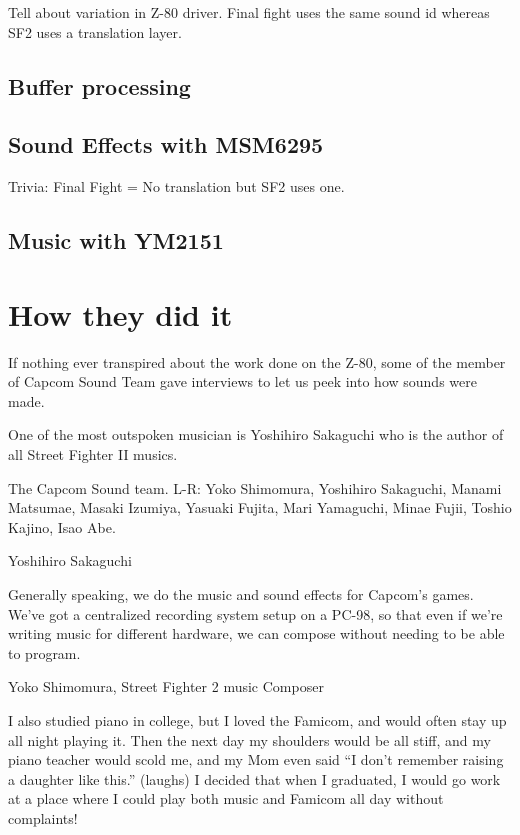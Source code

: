 Tell about variation in Z-80 driver. Final fight uses the same sound id whereas SF2 uses a translation layer.

\subsection{Buffer processing}

\subsection{Sound Effects with MSM6295}
Trivia: Final Fight = No translation but SF2 uses one.

\subsection{Music with YM2151}

\section{How they did it}
If nothing ever transpired about the work done on the Z-80, some of the member of Capcom Sound Team gave interviews to let us peek into how sounds were made.

One of the most outspoken musician is Yoshihiro Sakaguchi who is the author of all Street Fighter II musics.


The Capcom Sound team. L-R: Yoko Shimomura, Yoshihiro Sakaguchi, Manami Matsumae, Masaki Izumiya, Yasuaki Fujita, Mari Yamaguchi, Minae Fujii, Toshio Kajino, Isao Abe.

\begin{q}{Yoshihiro Sakaguchi\cite{yoko_shimomura_interview}  }

Generally speaking, we do the music and sound effects for Capcom’s games. We’ve got a centralized recording system setup on a PC-98, so that even if we’re writing music for different hardware, we can compose without needing to be able to program.
\end{q}

\begin{q}{Yoko Shimomura, Street Fighter 2 music Composer\cite{beep199010}}

I also studied piano in college, but I loved the Famicom, and would often stay up all night playing it. Then the next day my shoulders would be all stiff, and my piano teacher would scold me, and my Mom even said “I don’t remember raising a daughter like this.” (laughs) I decided that when I graduated, I would go work at a place where I could play both music and Famicom all day without complaints!
\end{q}

